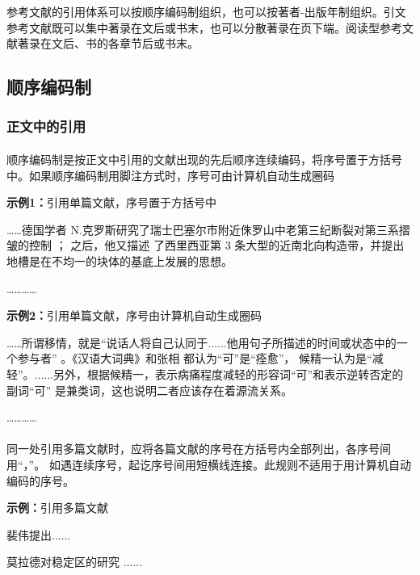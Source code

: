 \documentclass[twoside]{article}%
\begin{document}
参考文献的引用体系可以按顺序编码制组织，也可以按著者-出版年制组织。引文参考文献既可以集中著录在文后或书末，也可以分散著录在页下端。阅读型参考文献著录在文后、书的各章节后或书末。

\subsection{顺序编码制}\label{sec:ref:numeric}

\subsubsection{正文中的引用}\label{sec:numeric:cite}

\paragraph{} 顺序编码制是按正文中引用的文献出现的先后顺序连续编码，将序号置于方括号中。如果顺序编码制用脚注方式时，序号可由计算机自动生成圈码

\begin{refsection}
\textbf{示例1：}引用单篇文献，序号置于方括号中

……德国学者 N.克罗斯研究了瑞士巴塞尔市附近侏罗山中老第三纪断裂对第三系摺皱的控制
\cite{Sunstein1996-903-903}； 之后，他又描述
了西里西亚第 3 条大型的近南北向构造带，并提出地槽是在不均一的块体的基底上发展的思想\cite{Morri2010--}。

…………

\textbf{示例2：}引用单篇文献，序号由计算机自动生成圈码

……所谓移情，就是“说话人将自己认同于......他用句子所描述的时间或状态中的一个参与者”
。《汉语大词典》和张相
都认为“可”是“痊愈”，
候精一认为是“减轻”。......另外，根据候精一，表示病痛程度减轻的形容词“可”和表示逆转否定的副词“可”
是兼类词，这也说明二者应该存在着源流关系。

…………
\end{refsection}

\paragraph{} 同一处引用多篇文献时，应将各篇文献的序号在方括号内全部列出，各序号间用“，”。
如遇连续序号，起讫序号间用短横线连接。此规则不适用于用计算机自动编码的序号。

\begin{refsection}
\textbf{示例：}引用多篇文献

裴伟提出\cite{Humphrey1971--,KENNEDY1975-311-386}......

莫拉德对稳定区的研究
\cite{CRANE1972--,Weinstein1974-745-772,KENNEDY1975-311-386}......


\end{refsection}
\end{document}
